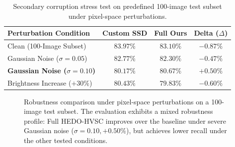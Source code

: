 \documentclass[pdflatex,sn-mathphys-num]{sn-jnl}%
\begin{document}
\begin{table}[!htbp]
\centering
\caption{Secondary corruption stress test on predefined 100-image test subset under pixel-space perturbations.}
\label{tab:robustness}
\begin{tabular}{lccc}
\toprule
\textbf{Perturbation Condition} & \textbf{Custom SSD} & \textbf{Full Ours} & \textbf{Delta ($\Delta$)} \\
\midrule
Clean (100-Image Subset) & $83.97\%$ & $83.10\%$ & $-0.87\%$ \\
Gaussian Noise ($\sigma=0.05$) & $82.77\%$ & $82.30\%$ & $-0.47\%$ \\
\textbf{Gaussian Noise ($\sigma=0.10$)} & $80.17\%$ & $\mathbf{80.67\%}$ & $\mathbf{+0.50\%}$ \\
Brightness Increase ($+30\%$) & $80.43\%$ & $79.83\%$ & $-0.60\%$ \\
\bottomrule
\end{tabular}
\end{table}

\begin{figure}[!htbp]
\centering
{}
\caption{Robustness comparison under pixel-space perturbations on a 100-image test subset. The evaluation exhibits a mixed robustness profile: Full HEDO-HVSC improves over the baseline under severe Gaussian noise ($\sigma=0.10, +0.50\%$), but achieves lower recall under the other tested conditions.}
\label{fig:robustness}
\end{figure}
\end{document}
